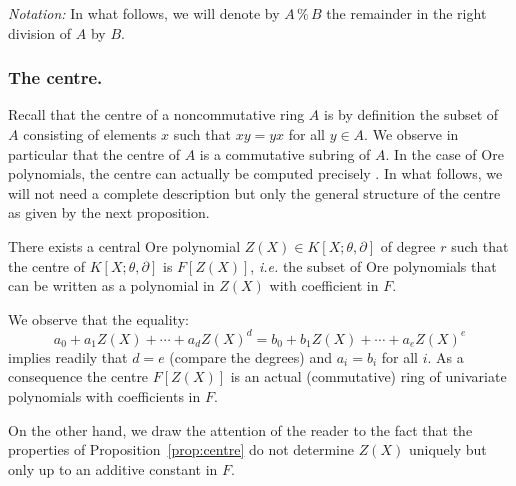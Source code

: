 \documentclass[a4paper]{llncs}
\renewcommand{\mod}{\,\%\,}
\begin{document}
\medskip

\noindent
\textit{Notation:}
In what follows, we will denote by $A \mod B$ the remainder in the 
right division of $A$ by $B$.

\subsubsection*{The centre.}

Recall that the centre of a noncommutative ring $A$ is by definition
the subset of $A$ consisting of elements $x$ such that $xy = yx$ for
all $y \in A$. We observe in particular that the centre of $A$ is a
commutative subring of $A$.
In the case of Ore polynomials, the centre can actually be computed
precisely \cite{}. 
In what follows, we will not need a complete description but only
the general structure of the centre as given by the next proposition.

\begin{proposition}
\label{prop:centre}
There exists a central Ore polynomial $Z(X) \in K[X; \theta, \partial]$ of 
degree $r$ such that the centre of $K[X; \theta, \partial]$ is 
$F[Z(X)]$, \emph{i.e.} the subset of Ore polynomials that can be
written as a polynomial in $Z(X)$ with coefficient in $F$.
\end{proposition}

We observe that the equality:
$$a_0 + a_1 Z(X) + \cdots + a_d Z(X)^d 
= b_0 + b_1 Z(X) + \cdots + a_e Z(X)^e$$
implies readily that $d = e$ (compare the degrees) and $a_i = b_i$ 
for all $i$. As a consequence the centre $F[Z(X)]$ is an actual
(commutative) ring of univariate polynomials with coefficients in $F$.

On the other hand, we draw the attention of the reader to the fact that 
the properties of Proposition~\ref{prop:centre} do not determine $Z(X)$ 
uniquely but only up to an additive constant in $F$.
\end{document}
